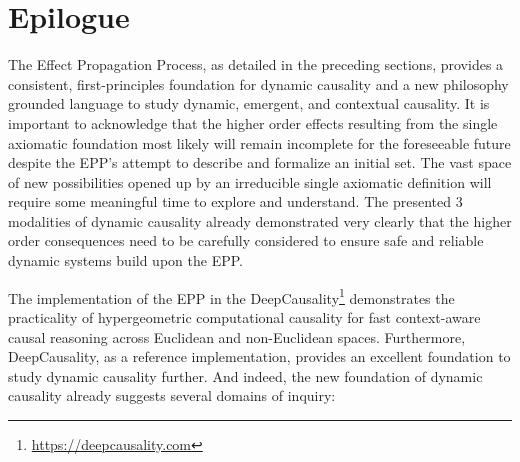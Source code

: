 \section{Epilogue}
\label{sec:epilogue}

 The Effect Propagation Process, as detailed in the preceding sections, provides a consistent, first-principles foundation for dynamic causality and a new philosophy grounded language to study dynamic, emergent, and contextual causality. It is important to acknowledge that the higher order effects resulting from the single axiomatic foundation most likely will remain incomplete for the foreseeable future despite the EPP's attempt to describe and formalize an initial set. The vast space of new possibilities opened up by  an irreducible single axiomatic definition will require some meaningful time to explore and understand. The presented 3 modalities of dynamic causality already demonstrated very clearly that the higher order consequences need to be carefully considered to ensure safe and reliable dynamic systems build upon the EPP. 

The implementation of the EPP in the DeepCausality\footnote{\url{https://deepcausality.com}} demonstrates the practicality of hypergeometric computational causality for fast context-aware causal reasoning across Euclidean and non-Euclidean spaces. Furthermore, DeepCausality, as a reference implementation, provides an excellent foundation to study dynamic causality further. And indeed, the new foundation of dynamic causality already suggests  several domains of inquiry: 

